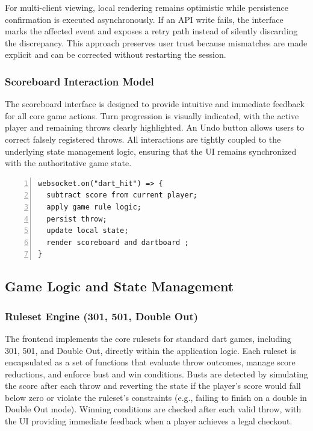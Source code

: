 For multi-client viewing, local rendering remains optimistic while persistence confirmation is executed asynchronously. If an API write fails, the interface marks the affected event and exposes a retry path instead of silently discarding the discrepancy. This approach preserves user trust because mismatches are made explicit and can be corrected without restarting the session.

\subsubsection{Scoreboard Interaction Model}
The scoreboard interface is designed to provide intuitive and immediate feedback for all core game actions. Turn progression is visually indicated, with the active player and remaining throws clearly highlighted. An Undo button allows users to correct falsely registered throws. All interactions are tightly coupled to the underlying state management logic, ensuring that the UI remains synchronized with the authoritative game state.

\begin{lstlisting}[numbers=left,caption=Frontend event/state flow, label=lst:frontend_event_flow]
websocket.on("dart_hit") => {
  subtract score from current player;
  apply game rule logic;
  persist throw;
  update local state;
  render scoreboard and dartboard ;
}
\end{lstlisting}

\subsection{Game Logic and State Management}

\subsubsection{Ruleset Engine (301, 501, Double Out)}
The frontend implements the core rulesets for standard dart games, including 301, 501, and Double Out, directly within the application logic. Each ruleset is encapsulated as a set of functions that evaluate throw outcomes, manage score reductions, and enforce bust and win conditions. Busts are detected by simulating the score after each throw and reverting the state if the player's score would fall below zero or violate the ruleset's constraints (e.g., failing to finish on a double in Double Out mode). Winning conditions are checked after each valid throw, with the UI providing immediate feedback when a player achieves a legal checkout.

